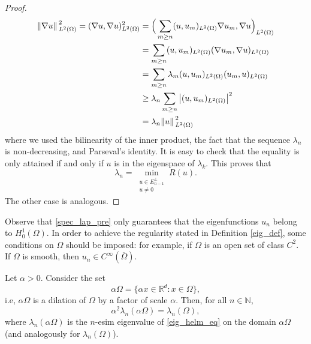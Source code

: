 \begin{proof}
    \begin{align*}
        \norm*{\nabla u}_{L^2(\Omega)}^2 = (\nabla u, \nabla u)_{L^2(\Omega)}^2 &= \Big(\sum_{m\geq n} (u, u_m)_{L^2(\Omega)} \nabla u_m, \nabla u \Big)_{L^2(\Omega)}\\
        &=\sum_{m\geq n} (u, u_m)_{L^2(\Omega)} (\nabla u_m, \nabla u)_{L^2(\Omega)}\\
        &=\sum_{m\geq n} \lambda_m (u, u_m)_{L^2(\Omega)} (u_m, u)_{L^2(\Omega)}\\
        & \geq \lambda_n \sum_{m\geq n} \abs{(u, u_m)_{L^2(\Omega)}}^2\\
        &= \lambda_n \norm*{u}_{L^2(\Omega)}^2
    \end{align*}
    where we used the bilinearity of the inner product, the fact that the sequence \(\lambda_n\) is non-decreasing, and Parseval's identity. It is easy to check that the equality is only attained if and only if \(u\) is in the eigenspace of \(\lambda_k\). This proves that
    \[
        \lambda_n = \min_{\substack{u \in E^\perp_{n-1} \\ u \neq 0}} R(u). 
    \]
    The other case is analogous.
\end{proof}
\begin{remark}
    Observe that \eqref{spec_lap_pre} only guarantees that the eigenfunctions \(u_n\) belong to \(H^1_0(\Omega)\). In order to achieve the regularity stated in Definition \eqref{eig_def}, some conditions on \(\Omega\) should be imposed: for example, if \(\Omega\) is an open set of class \(C^2\). If \(\Omega\) is smooth, then \(u_n \in C^\infty(\overline{\Omega})\).
\end{remark}

\begin{corollary}[Homogeneity]\label{lap_homo}
    Let \(\alpha > 0\). Consider the set
    \[
        \alpha \Omega = \{\alpha x \in \mathbb{R}^d: x \in \Omega\},
    \]
    i.e, \(\alpha \Omega\) is a dilation of \(\Omega\) by a factor of scale \(\alpha\).  
    Then, for all \(n \in \mathbb{N}\),
    \[
        \alpha^2 \lambda_n(\alpha \Omega) = \lambda_n(\Omega),
    \]
    where \(\lambda_n(\alpha \Omega)\) is the \(n\)-esim eigenvalue of \eqref{eig_helm_eq} on the domain \(\alpha \Omega\) (and analogously for \(\lambda_n(\Omega)\)).
\end{corollary}

